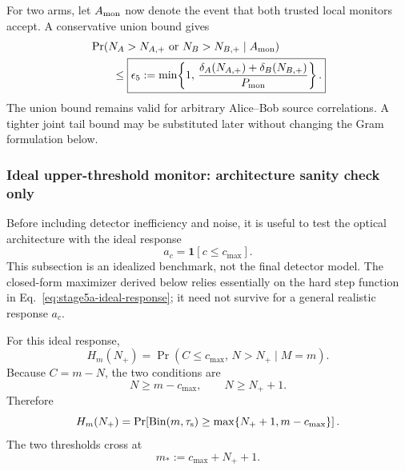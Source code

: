 \documentclass[11pt]{article}
\theoremstyle{remark}
\begin{document}
For two arms, let \(A_{\rm mon}\) now denote the event that both trusted local
monitors accept.  A conservative union bound gives
\begin{equation}
\begin{aligned}
    &\Pr(
      N_A>N_{A,+}\ \text{or}\ N_B>N_{B,+}
      \mid A_{\rm mon}
    )
    \\
    &\qquad\le
    \boxed{
    \epsilon_5
    :=
    \min\!\left\{
      1,\,
      \frac{
        \delta_A(N_{A,+})
        +
        \delta_B(N_{B,+})
      }{
        P_{\rm mon}
      }
    \right\}.
    }
    \label{eq:stage5a-twoarm-tail}
\end{aligned}
\end{equation}
The union bound remains valid for arbitrary Alice--Bob source correlations.
A tighter joint tail bound may be substituted later without changing the Gram
formulation below.

\subsubsection{Ideal upper-threshold monitor: architecture sanity check only}

Before including detector inefficiency and noise, it is useful to test the
optical architecture with the ideal response
\begin{equation}
    \boxed{
    a_c
    =
    \mathbf 1[c\le c_{\max}].
    }
    \label{eq:stage5a-ideal-response}
\end{equation}
This subsection is an idealized benchmark, not the final detector model.  The
closed-form maximizer derived below relies essentially on the hard step
function in Eq.~\eqref{eq:stage5a-ideal-response}; it need not survive for a
general realistic response \(a_c\).

For this ideal response,
\begin{equation}
    H_m(N_+)
    =
    \Pr(
      C\le c_{\max},\,N>N_+
      \mid M=m
    ).
    \label{eq:stage5a-ideal-H}
\end{equation}
Because \(C=m-N\), the two conditions are
\[
    N\ge m-c_{\max},
    \qquad
    N\ge N_++1.
\]
Therefore
\begin{equation}
    H_m(N_+)
    =
    \Pr\!\left[
      \operatorname{Bin}(m,\tau_{\rm s})
      \ge
      \max\{N_++1,m-c_{\max}\}
    \right].
    \label{eq:stage5a-ideal-H-binomial}
\end{equation}
The two thresholds cross at
\begin{equation}
    \boxed{
    m_*:=c_{\max}+N_++1.
    }
    \label{eq:stage5a-mstar}
\end{equation}
\end{document}

